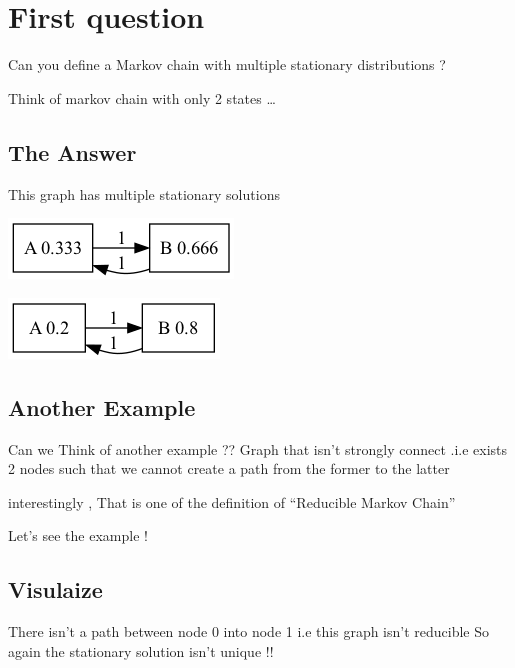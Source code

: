 \documentclass[11pt]{article}
\begin{document}
\section*{First question}
\label{sec:orgc561b6b}
Can you define a Markov chain with multiple stationary distributions ?

Think of markov chain with only 2 states \ldots{}

\subsection*{The Answer}
\label{sec:org1fc2dc5}
This graph has multiple stationary solutions

\begin{center}
\includegraphics[width=.9\linewidth]{multi_stationary_distribution1.png}
\end{center}

\begin{center}
\includegraphics[width=.9\linewidth]{multi_stationary_distribution2.png}
\end{center}



\subsection*{Another Example}
\label{sec:org70c2201}
Can we Think of another example ??
Graph that isn't strongly connect .i.e exists 2 nodes such that we cannot create a path from the former to the latter

interestingly , That is one of the definition of ``Reducible Markov Chain''

Let's see the example !



\subsection*{Visulaize}
\label{sec:orgb05e430}
There isn't a path between node 0 into node 1 i.e this graph isn't reducible
So again the stationary solution isn't unique !!
\end{document}
